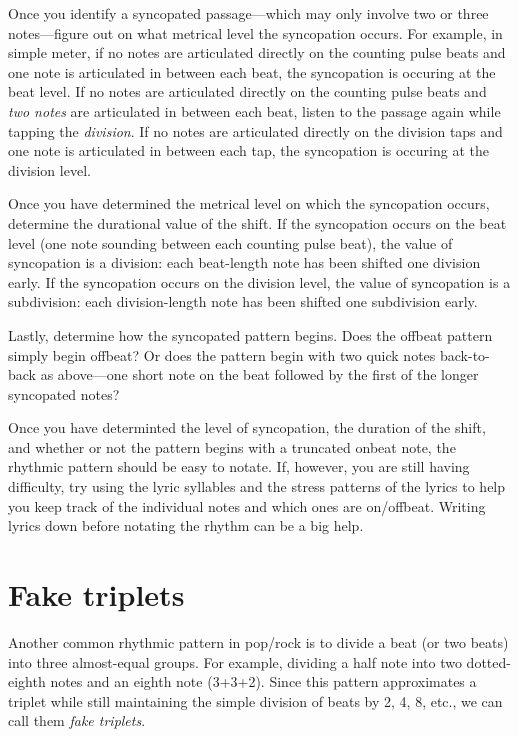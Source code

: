 \documentclass{book}
\begin{document}
Once you identify a syncopated passage---which may only involve two or three
notes---figure out on what metrical level the syncopation occurs. For example,
in simple meter, if no notes are articulated directly on the counting pulse
beats and one note is articulated in between each beat, the syncopation is
occuring at the beat level. If no notes are articulated directly on the
counting pulse beats and \emph{two notes} are articulated in between each
beat, listen to the passage again while tapping the \emph{division}. If no
notes are articulated directly on the division taps and one note is
articulated in between each tap, the syncopation is occuring at the division
level.

Once you have determined the metrical level on which the syncopation occurs,
determine the durational value of the shift. If the syncopation occurs on the
beat level (one note sounding between each counting pulse beat), the value of
syncopation is a division: each beat-length note has been shifted one division
early. If the syncopation occurs on the division level, the value of
syncopation is a subdivision: each division-length note has been shifted one
subdivision early.

Lastly, determine how the syncopated pattern begins. Does the offbeat pattern
simply begin offbeat? Or does the pattern begin with two quick notes
back-to-back as above---one short note on the beat followed by the first of
the longer syncopated notes?

Once you have determinted the level of syncopation, the duration of the shift,
and whether or not the pattern begins with a truncated onbeat note, the
rhythmic pattern should be easy to notate. If, however, you are still having
difficulty, try using the lyric syllables and the stress patterns of the
lyrics to help you keep track of the individual notes and which ones are
on/offbeat. Writing lyrics down before notating the rhythm can be a big help.

\hypertarget{fake-triplets}{%
\section{Fake triplets}\label{fake-triplets}}

Another common rhythmic pattern in pop/rock is to divide a beat (or two beats)
into three almost-equal groups. For example, dividing a half note into two
dotted-eighth notes and an eighth note (3+3+2). Since this pattern
approximates a triplet while still maintaining the simple division of beats by
2, 4, 8, etc., we can call them \emph{fake triplets}.
\end{document}
